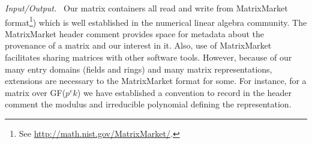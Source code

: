 \def\monitem#1{\par\textit{#1}\ }
\monitem{Input/Output.}
		Our matrix containers all read and write from MatrixMarket
		format\footnote{See \url{http://math.nist.gov/MatrixMarket/}.})
		which is well established in the numerical linear algebra
community.
The MatrixMarket header comment provides space for metadata about the provenance of a matrix and our interest in it.  Also, use of MatrixMarket facilitates sharing matrices with other software tools.  However, because of our many entry domains (fields and rings) and many matrix representations, extensions are necessary to the MatrixMarket format for some.
For instance, for a matrix over GF($p^ek$) we have established a convention to record in the header comment the modulus and irreducible polynomial defining the representation.

